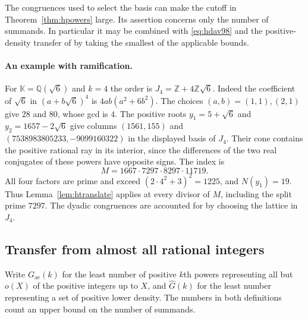 \documentclass[11pt,letterpaper]{article}
\theoremstyle{definition}
\numberwithin{equation}{section}
\begin{document}
The congruences used to select the basis can make the cutoff in
Theorem~\ref{thm:hpowers} large. Its assertion concerns only the
number of summands. In particular it may be combined with
\eqref{eq:hdav98} and the positive-density transfer of \cite{hdav99}
by taking the smallest of the applicable bounds.

\paragraph{An example with ramification.}
For $\mathbb K=\mathbb Q(\sqrt6)$ and $k=4$ the order is
$J_4=\mathbb Z+4\mathbb Z\sqrt6$. Indeed the coefficient of $\sqrt6$
in $(a+b\sqrt6)^4$ is $4ab(a^2+6b^2)$. The choices
$(a,b)=(1,1),(2,1)$ give $28$ and $80$, whose gcd is $4$.
The positive roots $y_1=5+\sqrt6$ and $y_2=1657-2\sqrt6$
give columns $(1561,155)$ and $(7538983805233,-9099160322)$ in
the displayed basis of $J_4$. Their cone contains the positive
rational ray in its interior, since the differences of the two
real conjugates of these powers have opposite signs.
The index is
\[
 M=1667\cdot7297\cdot8297\cdot11719 .
\]
All four factors are prime and exceed $(2\cdot4^2+3)^2=1225$, and
$N(y_1)=19$. Thus Lemma~\ref{lem:htranslate} applies at every divisor
of $M$, including the split prime $7297$. The dyadic congruences are
accounted for by choosing the lattice in $J_4$.

\subsection{Transfer from almost all rational integers}
Write $G_{\mathrm{ae}}(k)$ for the least number of positive $k$th powers
representing all but $o(X)$ of the positive integers up to $X$, and
$\widehat G(k)$ for the least number representing a set of positive
lower density. The numbers in both definitions count an upper bound on
the number of summands.
\end{document}
